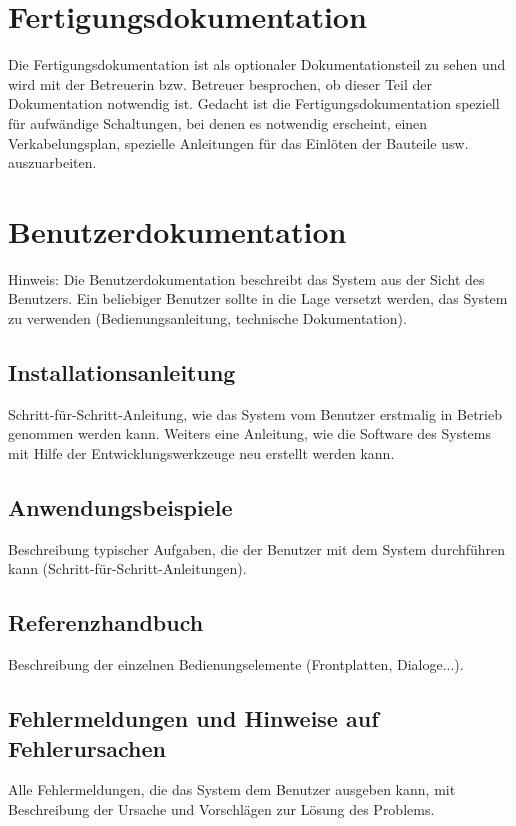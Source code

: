 \documentclass[12pt,a4paper]{article}
\newcommand{\yhbu}[0]{\color{ydkbu}}	%
\begin{document}
{\section{\sc Fertigungsdokumentation}
	{\yhbu
	Die Fertigungsdokumentation ist als optionaler Dokumentationsteil zu sehen und
	wird mit der Betreuerin bzw. Betreuer besprochen, ob dieser Teil der Dokumentation
	notwendig ist. Gedacht ist die Fertigungsdokumentation speziell für aufwändige
	Schaltungen, bei denen es notwendig erscheint, einen Verkabelungsplan, spezielle
	Anleitungen für das Einlöten der Bauteile usw. auszuarbeiten.
	}
\section{\sc Benutzerdokumentation}
	{\yhbu
	Hinweis: Die Benutzerdokumentation beschreibt das System aus der Sicht des
	Benutzers. Ein beliebiger Benutzer sollte in die Lage versetzt werden, das System
	zu verwenden (Bedienungsanleitung, technische Dokumentation).
	}
 \subsection{Installationsanleitung}
	{\yhbu
	Schritt-für-Schritt-Anleitung, wie das System vom Benutzer erstmalig in Betrieb
	genommen werden kann. Weiters eine Anleitung, wie die Software des Systems mit
	Hilfe der Entwicklungswerkzeuge neu erstellt werden kann.
	}
 \subsection{Anwendungsbeispiele}
	{\yhbu
	Beschreibung typischer Aufgaben, die der Benutzer mit dem System durchführen
	kann (Schritt-für-Schritt-Anleitungen).
	}
 \subsection{Referenzhandbuch}
	{\yhbu
	Beschreibung der einzelnen Bedienungselemente (Frontplatten, Dialoge...).
	}
 \subsection{Fehlermeldungen und Hinweise auf Fehlerursachen}
	{\yhbu
	Alle Fehlermeldungen, die das System dem Benutzer ausgeben kann, mit
	Beschreibung der Ursache und Vorschlägen zur Lösung des Problems.
	}









}
\end{document}
